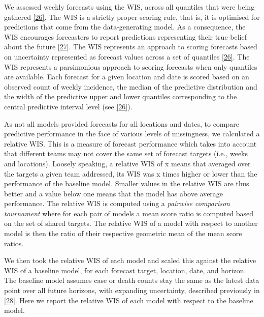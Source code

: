 \documentclass[
]{article}
\begin{document}
We assessed weekly forecasts using the WIS, across all quantiles that
were being gathered
\protect\hyperlink{ref-bracherEvaluatingEpidemicForecasts2021}{{[}26{]}}.
The WIS is a strictly proper scoring rule, that is, it is optimised for
predictions that come from the data-generating model. As a consequence,
the WIS encourages forecasters to report predictions representing their
true belief about the future
\protect\hyperlink{ref-gneitingStrictlyProperScoring2007}{{[}27{]}}. The
WIS represents an approach to scoring forecasts based on uncertainty
represented as forecast values across a set of quantiles
\protect\hyperlink{ref-bracherEvaluatingEpidemicForecasts2021}{{[}26{]}}.
The WIS represents a parsimonious approach to scoring forecasts when
only quantiles are available. Each forecast for a given location and
date is scored based on an observed count of weekly incidence, the
median of the predictive distribution and the width of the predictive
upper and lower quantiles corresponding to the central predictive
interval level (see
\protect\hyperlink{ref-bracherEvaluatingEpidemicForecasts2021}{{[}26{]}}).

As not all models provided forecasts for all locations and dates, to
compare predictive performance in the face of various levels of
missingness, we calculated a relative WIS. This is a measure of forecast
performance which takes into account that different teams may not cover
the same set of forecast targets (i.e., weeks and locations). Loosely
speaking, a relative WIS of x means that averaged over the targets a
given team addressed, its WIS was x times higher or lower than the
performance of the baseline model. Smaller values in the relative WIS
are thus better and a value below one means that the model has above
average performance. The relative WIS is computed using a \emph{pairwise
comparison tournament} where for each pair of models a mean score ratio
is computed based on the set of shared targets. The relative WIS of a
model with respect to another model is then the ratio of their
respective geometric mean of the mean score ratios.

We then took the relative WIS of each model and scaled this against the
relative WIS of a baseline model, for each forecast target, location,
date, and horizon. The baseline model assumes case or death counts stay
the same as the latest data point over all future horizons, with
expanding uncertainty, described previously in
\protect\hyperlink{ref-cramerEvaluationIndividualEnsemble2021}{{[}28{]}}.
Here we report the relative WIS of each model with respect to the
baseline model.
\end{document}
